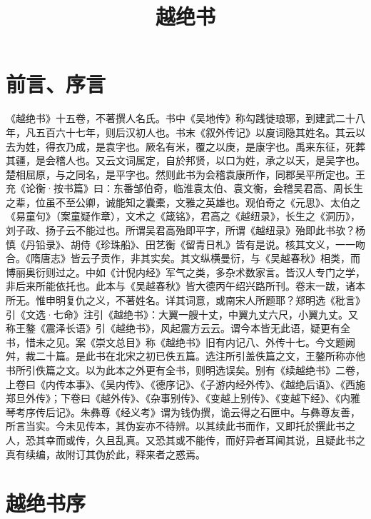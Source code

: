 \documentclass[12pt,UTF8]{ctexbook}
\title{\heiti\zihao{0} 越绝书}
\author{}
\date{}
\begin{document}
\maketitle
\tableofcontents

\frontmatter
\chapter{前言、序言}

《越绝书》十五卷，不著撰人名氏。书中《吴地传》称勾践徙琅琊，到建武二十八年，凡五百六十七年，则后汉初人也。书末《叙外传记》以廋词隐其姓名。其云以去为姓，得衣乃成，是袁字也。厥名有米，覆之以庚，是康字也。禹来东征，死葬其疆，是会稽人也。又云文词属定，自於邦贤，以口为姓，承之以天，是吴字也。楚相屈原，与之同名，是平字也。然则此书为会稽袁康所作，同郡吴平所定也。王充《论衡·按书篇》曰：东番邹伯奇，临淮袁太伯、袁文衡，会稽吴君高、周长生之辈，位虽不至公卿，诚能知之囊橐，文雅之英雄也。观伯奇之《元思》、太伯之《易童句》（案童疑作章），文术之《箴铭》，君高之《越纽录》，长生之《洞历》，刘子政、扬子云不能过也。所谓吴君高殆即平字，所谓《越纽录》殆即此书欤？杨慎《丹铅录》、胡侍《珍珠船》、田艺衡《留青日札》皆有是说。核其文义，一一吻合。《隋唐志》皆云子贡作，非其实矣。其文纵横曼衍，与《吴越春秋》相类，而博丽奥衍则过之。中如《计倪内经》军气之类，多杂术数家言。皆汉人专门之学，非后来所能依托也。此本与《吴越春秋》皆大德丙午绍兴路所刊。卷末一跋，诸本所无。惟申明复仇之义，不著姓名。详其词意，或南宋人所题耶？郑明选《秕言》引《文选·七命》注引《越绝书》：大翼一艘十丈，中翼九丈六尺，小翼九丈。又称王鏊《震泽长语》引《越绝书》，风起震方云云。谓今本皆无此语，疑更有全书，惜未之见。案《崇文总目》称《越绝书》旧有内记八、外传十七。今文题阙舛，裁二十篇。是此书在北宋之初已佚五篇。选注所引盖佚篇之文，王鏊所称亦他书所引佚篇之文。以为此本之外更有全书，则明选误矣。别有《续越绝书》二卷，上卷曰《内传本事》、《吴内传》、《德序记》、《子游内经外传》、《越绝后语》、《西施郑旦外传》；下卷曰《越外传》、《杂事别传》、《变越上别传》、《变越下经》、《内雅琴考序传后记》。朱彝尊《经义考》谓为钱伪撰，诡云得之石匣中。与彝尊友善，所言当实。今未见传本，其伪妄亦不待辨。以其续此书而作，又即托於撰此书之人，恐其幸而或传，久且乱真。又恐其或不能传，而好异者耳闻其说，且疑此书之真有续编，故附订其伪於此，释来者之惑焉。

\chapter{越绝书序}



\mainmatter
\end{document}
